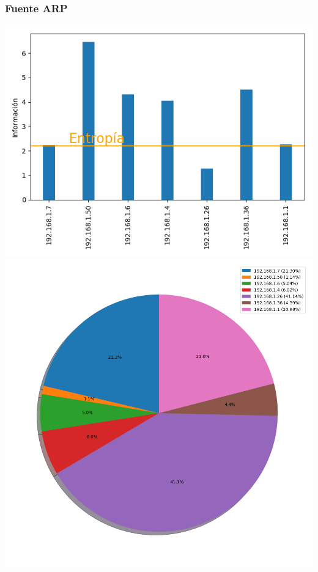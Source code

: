 \subsubsection{Fuente ARP}

 \includegraphics[scale=0.6]{../plots/mauro_s2_informacion.png}
 \includegraphics[scale=0.4]{../plots/mauro_s2_probabilidades.png}

